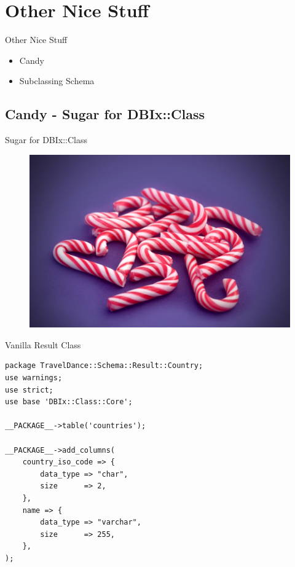\section{Other Nice Stuff}

\begin{frame}{Other Nice Stuff}
\begin{itemize}
\item Candy
\item Subclassing Schema
\end{itemize}
\end{frame}

\subsection{Candy - Sugar for DBIx::Class}

\begin{frame}{Sugar for DBIx::Class}
\begin{figure}[!ht]
\centering
\includegraphics[width=0.8\linewidth]{img/candy-cane.jpg}
\end{figure}
\end{frame}

\begin{frame}[fragile]{Vanilla Result Class}
\begin{lstlisting}
package TravelDance::Schema::Result::Country;
use warnings;
use strict;
use base 'DBIx::Class::Core';

__PACKAGE__->table('countries');

__PACKAGE__->add_columns(
    country_iso_code => {
        data_type => "char",
        size      => 2,
    },
    name => {
        data_type => "varchar",
        size      => 255,
    },
);
\end{lstlisting}
\end{frame}

